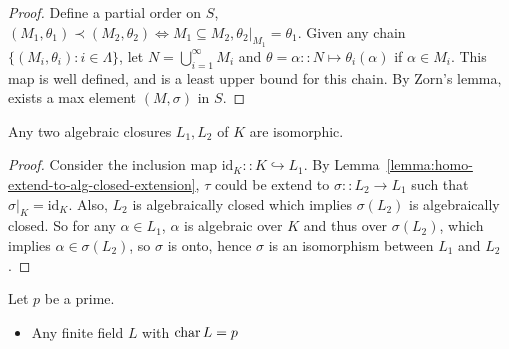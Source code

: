 \begin{theorem}
\begin{lemma}
\begin{proof}
      Define a partial order on $S$, $(M_1, \theta_1) \prec (M_2, \theta_2) \iff M_1 \subseteq M_2, \theta_2 \big|_{M_1} = \theta_1$.
      Given any chain $\{(M_i, \theta_i) : i \in \Lambda \}$, let $N = \bigcup_{i = 1}^\infty M_i$ and
      $\theta = \alpha :: N \mapsto \theta_i(\alpha)$ if $\alpha \in M_i$. This map is well defined, and is
      a  least upper bound for this chain. By Zorn's lemma, exists a max element $(M, \sigma)$ in $S$.
    \end{proof}
  \end{lemma}

  \begin{theorem}
    Any two algebraic closures $L_1, L_2$ of $K$ are isomorphic.
    \begin{proof}
      Consider the inclusion map $\text{id}_K :: K \hookrightarrow L_1$.
      By Lemma~\ref{lemma:homo-extend-to-alg-closed-extension},
      $\tau$ could be extend to $\sigma :: L_2 \to L_1$ such that $\sigma\big|_K = \text{id}_K$.
      Also, $L_2$ is algebraically closed which implies $\sigma(L_2)$ is algebraically closed.
      So for any $\alpha \in L_1$, $\alpha$ is algebraic over $K$ and thus over $\sigma(L_2)$,
      which implies $\alpha \in \sigma(L_2)$, so $\sigma$ is onto, hence $\sigma$ is an
      isomorphism between $L_1$ and $L_2$.
    \end{proof}
  \end{theorem}

  \begin{example}
    Let $p$ be a prime.
    \begin{itemize}
      \item Any finite field $L$ with $\operatorname{char} L = p$
    \end{itemize}
  \end{example}
\end{theorem}

